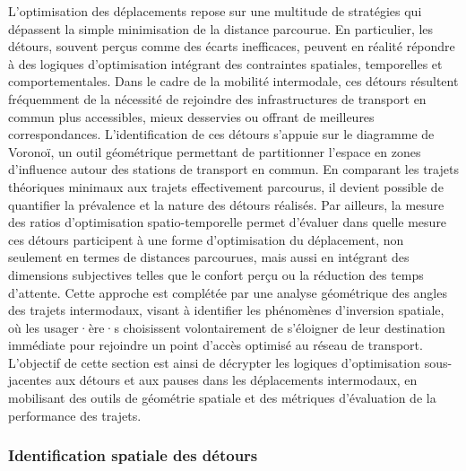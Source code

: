 \begin{refsegment}
L’optimisation des déplacements repose sur une multitude de stratégies qui dépassent la simple minimisation de la distance parcourue. En particulier, les détours, souvent perçus comme des écarts inefficaces, peuvent en réalité répondre à des logiques d’optimisation intégrant des contraintes spatiales, temporelles et comportementales. Dans le cadre de la mobilité intermodale, ces détours résultent fréquemment de la nécessité de rejoindre des infrastructures de transport en commun plus accessibles, mieux desservies ou offrant de meilleures correspondances. L’identification de ces détours s’appuie sur le diagramme de Voronoï, un outil géométrique permettant de partitionner l’espace en zones d’influence autour des stations de transport en commun. En comparant les trajets théoriques minimaux aux trajets effectivement parcourus, il devient possible de quantifier la prévalence et la nature des détours réalisés. Par ailleurs, la mesure des ratios d’optimisation spatio-temporelle permet d’évaluer dans quelle mesure ces détours participent à une forme d’optimisation du déplacement, non seulement en termes de distances parcourues, mais aussi en intégrant des dimensions subjectives telles que le confort perçu ou la réduction des temps d’attente. Cette approche est complétée par une analyse géométrique des angles des trajets intermodaux, visant à identifier les phénomènes d’inversion spatiale, où les usager·ère·s choisissent volontairement de s’éloigner de leur destination immédiate pour rejoindre un point d’accès optimisé au réseau de transport. L’objectif de cette section est ainsi de décrypter les logiques d’optimisation sous-jacentes aux détours et aux pauses dans les déplacements intermodaux, en mobilisant des outils de géométrie spatiale et des métriques d’évaluation de la performance des trajets.%

\subsubsection*{Identification spatiale des détours
    \label{chap5:identification-detours}
    }


\end{refsegment}

